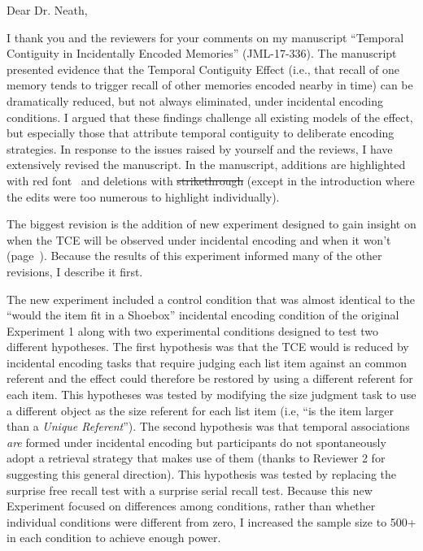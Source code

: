 \documentclass[12pt]{article}
\begin{document}
Dear Dr. Neath,
 

I thank you and the reviewers for your comments on my manuscript  ``Temporal Contiguity in Incidentally Encoded Memories'' (JML-17-336). The manuscript presented evidence that the Temporal Contiguity Effect (i.e., that recall of one memory tends to trigger recall of other memories encoded nearby in time) can be dramatically reduced, but not always eliminated, under incidental encoding conditions. I argued that these findings challenge all existing models of the effect, but especially those that attribute temporal contiguity to deliberate encoding strategies. In response to the issues raised by yourself and the reviews, I have extensively revised the manuscript. In the manuscript, additions are highlighted with   \color{red}red font\color{black}~ and deletions with \st{strikethrough} (except in the introduction where the edits were too numerous to highlight individually).

The biggest revision is the addition of new experiment designed to gain insight on when the TCE will be observed under incidental encoding and when it won't (page~\pageref{newexp}). Because the results of this experiment informed many of the other revisions, I describe it first.

The new experiment included a control condition that was almost identical to the ``would the item fit in a Shoebox'' incidental encoding condition of the original Experiment 1 along with two experimental conditions designed to test two different hypotheses. The first hypothesis was that the TCE would is reduced by incidental encoding tasks that require judging each list item against an common referent and the effect could therefore be restored by using a different referent for each item. This hypotheses was tested by modifying the size judgment task to use a different object as the size referent for each list item (i.e, ``is the item larger than a \emph{Unique Referent}''). The second hypothesis was that temporal associations \emph{are} formed under incidental encoding but participants do not spontaneously adopt a retrieval strategy that makes use of them (thanks to Reviewer 2 for suggesting this general direction). This hypothesis was tested by replacing the surprise free recall test with a surprise serial recall test. Because this new Experiment focused on differences among conditions, rather than whether individual conditions were different from zero, I increased the sample size to 500+ in each condition to achieve enough power.
\end{document}
